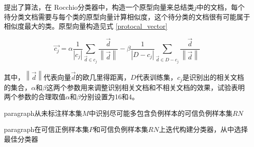 
\citet{li2003learning}提出了算法\cite{li2003learning}，在 Rocchio分类器中，构造一个原型向量来总结类$j$中的文档，每个待分类文档需要与每个类的原型向量计算相似度，这个待分类的文档很有可能属于相似度最大的类。原型向量构造见式 \ref{protocal_vector}

\begin{equation}
\overrightarrow{c_j} = \alpha \frac{1}{\left | c_j \right |}
         \sum\limits_{\overrightarrow{d} \in c_j}\frac{\overrightarrow{d}}{\left \| \overrightarrow{d} \right \| } -
         \beta \frac{1}{\left | D - c_j \right |}
         \sum\limits_{\overrightarrow{d} \in D - c_j} 
         \frac{\overrightarrow{d}}{\left \| \overrightarrow{d} \right \|}
\label{protocal_vector}
\end{equation}

其中，$\left \| \overrightarrow{d} \right \|$代表向量$\overrightarrow{d}$的欧几里得距离，$D$代表训练集，$c_j$是识别出的相关文档的集合，$\alpha$和$\beta$这两个参数用来调整识别相关文档和不相关文档的效果，试验表明两个参数的合理取值$\alpha$和$\beta$分别设置为16和4。

paragraph{从未标注样本集$M$中识别尽可能多包含负例样本的可信负例样本集$RN$}

paragraph{在可信正例样本集$P$和可信负例样本集$RN$上迭代构建分类器，从中选择最佳分类器}

